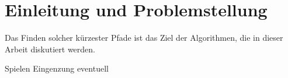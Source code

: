\chapter{Einleitung und Problemstellung}


Das Finden solcher kürzester Pfade ist das Ziel der Algorithmen, die in dieser Arbeit diskutiert werden.

Spielen Eingenzung eventuell